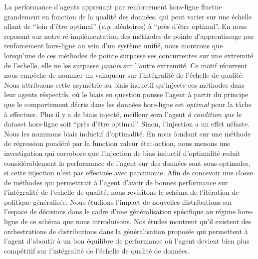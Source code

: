 La performance d'agents apprenant par renforcement hors-ligne fluctue grandement en fonction
de la qualité des données, qui peut varier
sur une échelle allant de
``loin d'être optimal'' (\textit{e.g.} aléatoires)
à ``près d'être optimal''.
En nous reposant sur notre ré-implémentation des méthodes de pointe d'apprentissage par
renforcement hors-ligne au sein d'un système unifié,
nous montrons que lorsqu'une de ces méthodes de pointe surpasse ses concurrentes
sur une extremité de l'echelle, elle ne les surpasse \emph{jamais} sur l'autre extremité.
Ce motif récurrent nous empêche de nommer un vainqueur sur l'intégralité de l'échelle de qualité.
Nous attribuons cette asymétrie au biais inductif qu'injecte ces méthodes dans leur agents
réspectifs, où le biais en question pousse l'agent à partir du principe que le
comportement décris dans les données hors-ligne est \emph{optimal} pour la tâche
à effectuer.
Plus il y a de biais injecté, meilleur sera l'agent \emph{à condition que}
le dataset hors-ligne soit ``près d'être optimal''.
Sinon, l'injection a un effet néfaste.
Nous les nommons biais inductif d'optimalité.
En nous fondant sur une méthode de régression pondéré par la function valeur état-action,
nous menons une investigation qui corrobore que l'injection de bias inductif d'optimalité
reduit considérablement la performance de l'agent sur des données sont sous-optimales,
si cette injection n'est pas effectuée avec parcimonie.
Afin de concevoir une classe de méthodes qui permettrait à l'agent d'avoir de bonnes
performance sur l'intégralité de l'echelle de qualité,
nous revisitons le schéma de l'itération de politique généralisée.
Nous étudions l'impact de nouvelles distributions sur l'espace de décisions
dans le cadre d'une généralisation spécifique au régime hors-ligne
de ce schéma que nous introduisons.
Nos études montrent qu'il existent des orchestrations de distributions dans la
généralisation proposée qui permettent à l'agent d'aboutir à un bon équilibre
de performance où l'agent devient bien plus
compétitif sur l'intégralité de l'échelle de qualité de données.
